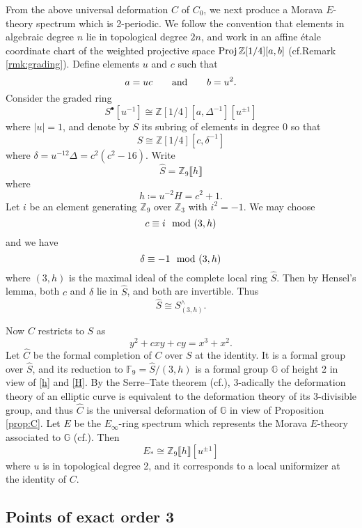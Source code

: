 \documentclass{gtpart}
\theoremstyle{definition}
\theoremstyle{remark}
\newcommand{\mb}[1]{\mathbb{#1}}
\newcommand{\Proj}{{\rm Proj\thinspace}}
\newcommand{\cf}{cf.\thinspace}
\newcommand{\BF}{{\mb F}}
\newcommand{\BG}{{\mb G}}
\newcommand{\BZ}{{\mb Z}}
\newcommand{\HC}{\widehat{C}}
\newcommand{\HS}{\widehat{S}}
\newcommand{\md}{~~{\rm mod}~}
\newcommand{\ad}{{\rm and}}
\newcommand{\s}{S^\bullet}
\begin{document}
From the above universal deformation $C$ of $C_0$, we next produce a Morava $E$-theory spectrum which is 2-periodic.  
We follow the convention that elements in algebraic degree $n$ lie in topological degree $2n$, and work in an affine \'etale coordinate chart of 
the weighted projective space $\Proj \BZ [1/4] [a, b]$ (\cf Remark \ref{rmk:grading}).  
Define elements $u$ and $c$ such that 
\[
 a = u c \qquad \ad \qquad b = u^2.  
\]
Consider the graded ring 
\[
 \s [u^{-1}] \cong \BZ [1/4] [a, \Delta^{-1}] [u^{\pm1}] 
\]
where $|u| = 1$, and denote by $S$ its subring of elements in degree 0 so that 
\begin{equation}
\label{S}
 S \cong \BZ [1/4] [c, \delta^{-1}] 
\end{equation}
where $\delta = u^{-12} \Delta = c^2 (c^2 - 16)$.  Write 
\[
 \HS = \BZ_9 \llbracket h \rrbracket 
\]
where 
\begin{equation}
\label{h}
 h \coloneqq u^{-2} H = c^2 + 1.  
\end{equation}
Let $i$ be an element generating $\BZ_9$ over $\BZ_3$ with $i^2 = -1$.  
We may choose 
\[
 c \equiv i \md (3,h) 
\]
and we have 
\[
 \delta \equiv -1 \md (3,h) 
\]
where $(3,h)$ is the maximal ideal of the complete local ring $\HS$.  
Then by Hensel's lemma, both $c$ and $\delta$ lie in $\HS$, and both are invertible.  Thus 
\[
 \HS \cong S_{(3,h)}^\wedge.  
\]

Now $C$ restricts to $S$ as 
\begin{equation}
\label{Cc}
 y^2 + c x y + c y = x^3 + x^2.  
\end{equation}
Let $\HC$ be the formal completion of $C$ over $S$ at the identity.  
It is a formal group over $\HS$, and its reduction to $\BF_9 = \HS / (3,h)$ 
is a formal group $\BG$ of height 2 in view of \eqref{h} and \eqref{H}.  
By the Serre--Tate theorem (\cf \cite[2.9.1]{KM}), 
3-adically the deformation theory of an elliptic curve is equivalent to 
the deformation theory of its 3-divisible group, 
and thus $\HC$ is the universal deformation of $\BG$ in view of Proposition \ref{prop:C}.  
Let $E$ be the $E_\infty$-ring spectrum which represents the Morava $E$-theory 
associated to $\BG$ (\cf \cite[Corollary 7.6]{GH}).  Then 
\[
 E_* \cong \BZ_9 \llbracket h \rrbracket [u^{\pm 1}] 
\]
where $u$ is in topological degree 2, and it corresponds to a local uniformizer at the identity of $C$.  


\subsection{Points of exact order 3}
\end{document}
